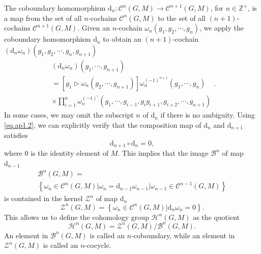\documentclass[%
 reprint,
 amsmath,amssymb,
 aps,
prb,
]{revtex4-2}
\begin{document}
The coboundary homomorphism $\mathrm{d}_{n} :\mathcal{C}^{n}( G,M) \rightarrow \mathcal{C}^{n+1}( G,M)$, for $n\in \mathbb{Z}^{+}$, is a map from the set of all $n$-cochains $\mathcal{C}^{n}( G,M)$ to the set of all $( n+1)$-cochains $\mathcal{C}^{n+1}( G,M)$. Given an $n$-cochain $\omega _{n}( g_{1} ,g_{2} ,\cdots ,g_{n})$, we apply the coboundary homomorphism $\mathrm{d}_{n}$ to obtain an $( n+1)$-cochain $(\mathrm{d}_{n} \omega _{n})( g_{1} ,g_{2} ,\cdots ,g_{n} ,g_{n+1})$ 
\begin{equation}
\begin{array}{ l }
(\mathrm{d}_{n} \omega _{n})( g_{1} ,\cdots ,g_{n+1})\\
=[ g_{1}\triangleright \omega _{n}( g_{2} ,\cdots ,g_{n+1})] \omega _{n}^{( -1)^{n+1}}( g_{1} ,\cdots ,g_{n}) \\
\times \prod _{i=1}^{n} \omega _{n}^{( -1)^{i}}( g_{1} ,\cdots ,g_{i-1} ,g_{i} g_{i+1} ,g_{i+2} ,\cdots ,g_{n+1})
\end{array} .\label{eq.ap1.2}
\end{equation}
In some cases, we may omit the subscript $n$ of $\mathrm{d}_{n}$ if there is no ambiguity. Using \eqref{eq.ap1.2}, we can explicitly verify that the composition map of $\mathrm{d}_{n}$ and $\mathrm{d}_{n+1}$ satisfies 
\begin{equation}
\mathrm{d}_{n+1} \circ \mathrm{d}_{n} =0, \label{eq.ap1.3}
\end{equation}
where $0$ is the identity element of $M$. This implies that the image $\mathcal{B}^{n}$ of map $\mathrm{d}_{n-1}$ 
\begin{equation}
\begin{array}{ l }
\mathcal{B}^{n}( G,M) =\\
\left\{\omega _{n} \in \mathcal{C}^{n}( G,M) |\omega _{n} =\mathrm{d}_{n-1} \omega _{n-1} |\omega _{n-1} \in \mathcal{C}^{n-1}( G,M)\right\}
\end{array} \label{eq.ap1.4}
\end{equation}
is contained in the kernel $\mathcal{Z}^{n}$ of map $\mathrm{d}_{n}$
\begin{equation}
\mathcal{Z}^{n}( G,M) =\left\{\omega _{n} \in \mathcal{C}^{n}( G,M) |\mathrm{d}_{n} \omega _{n} =0\right\} . \label{eq.ap1.5}
\end{equation}
This allows us to define the cohomology group $\mathcal{H}^{n}( G,M)$ as the quotient 
\begin{equation}
\mathcal{H}^{n}( G,M) =\mathcal{Z}^{n}( G,M) /\mathcal{B}^{n}( G,M). \label{eq.ap1.6}
\end{equation}
An element in $\mathcal{B}^{n}( G,M)$ is called an $n$-coboundary, while an element in $\mathcal{Z}^{n}( G,M)$ is called an $n$-cocycle.
\end{document}
